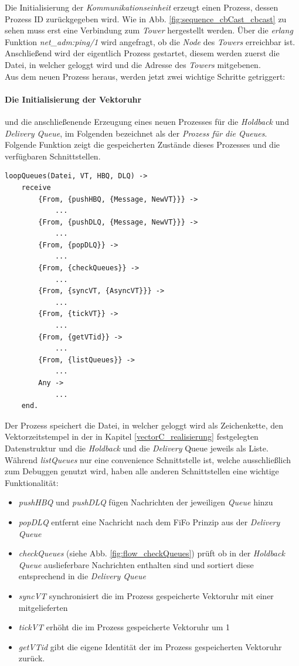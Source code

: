 Die Initialisierung der \textit{Kommunikationseinheit} erzeugt einen Prozess, dessen Prozess ID zurückgegeben wird.
Wie in Abb. \ref{fig:sequence_cbCast_cbcast} zu sehen muss erst eine Verbindung zum \textit{Tower} hergestellt werden. Über die \textit{erlang} Funktion \textit{net\_adm:ping/1} wird angefragt, ob die \textit{Node} des \textit{Towers} erreichbar ist. Anschließend wird der eigentlich Prozess gestartet, diesem werden zuerst die Datei, in welcher geloggt wird und die Adresse des \textit{Towers} mitgebenen.\\Aus dem neuen Prozess heraus, werden jetzt zwei wichtige Schritte getriggert:

\paragraph{Die Initialisierung der Vektoruhr} und die anschließenende Erzeugung eines neuen Prozesses für die \textit{Holdback} und \textit{Delivery Queue}, im Folgenden bezeichnet als der \textit{Prozess für die Queues}. Folgende Funktion zeigt die gespeicherten Zustände dieses Prozesses und die verfügbaren Schnittstellen.

\begin{lstlisting}
loopQueues(Datei, VT, HBQ, DLQ) ->
    receive
        {From, {pushHBQ, {Message, NewVT}}} ->
            ...
        {From, {pushDLQ, {Message, NewVT}}} ->
            ...
        {From, {popDLQ}} ->
            ...
        {From, {checkQueues}} ->
            ...
        {From, {syncVT, {AsyncVT}}} ->
            ...
        {From, {tickVT}} -> 
            ...
        {From, {getVTid}} ->
            ...
        {From, {listQueues}} ->
            ...
        Any -> 
            ...
    end.
\end{lstlisting}

Der Prozess speichert die Datei, in welcher geloggt wird als Zeichenkette, den Vektorzeitstempel in der in Kapitel \ref{vectorC_realisierung} festgelegten Datenstruktur und die \textit{Holdback} und die \textit{Delivery} Queue jeweils als Liste. Während \textit{listQueues} nur eine convenience Schnittstelle ist, welche ausschließlich zum Debuggen genutzt wird, haben alle anderen Schnittstellen eine wichtige Funktionalität: 
\begin{itemize}
    \item \textit{pushHBQ} und \textit{pushDLQ} fügen Nachrichten der jeweiligen \textit{Queue} hinzu
    \item \textit{popDLQ} entfernt eine Nachricht nach dem FiFo Prinzip aus der \textit{Delivery Queue}
    \item \textit{checkQueues} (siehe Abb. \ref{fig:flow_checkQueues}) prüft ob in der \textit{Holdback Queue} auslieferbare Nachrichten enthalten sind und sortiert diese entsprechend in die \textit{Delivery Queue}
    \item \textit{syncVT} synchronisiert die im Prozess gespeicherte Vektoruhr mit einer mitgelieferten
    \item \textit{tickVT} erhöht die im Prozess gespeicherte Vektoruhr um 1
    \item \textit{getVTid} gibt die eigene Identität der im Prozess gespeicherten Vektoruhr zurück. 
\end{itemize}


